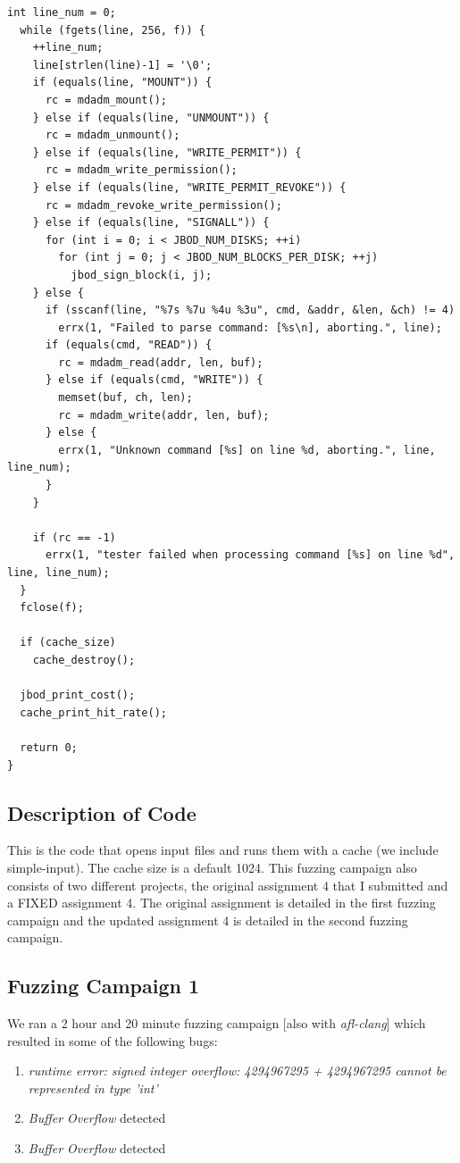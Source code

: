 \documentclass[11pt]{article}
\begin{document}
\begin{lstlisting}[style=CStyle]
  int line_num = 0;
  while (fgets(line, 256, f)) {
    ++line_num;
    line[strlen(line)-1] = '\0';
    if (equals(line, "MOUNT")) {
      rc = mdadm_mount();
    } else if (equals(line, "UNMOUNT")) {
      rc = mdadm_unmount();
    } else if (equals(line, "WRITE_PERMIT")) {
      rc = mdadm_write_permission();
    } else if (equals(line, "WRITE_PERMIT_REVOKE")) {
      rc = mdadm_revoke_write_permission();
    } else if (equals(line, "SIGNALL")) {
      for (int i = 0; i < JBOD_NUM_DISKS; ++i)
        for (int j = 0; j < JBOD_NUM_BLOCKS_PER_DISK; ++j)
          jbod_sign_block(i, j);
    } else {
      if (sscanf(line, "%7s %7u %4u %3u", cmd, &addr, &len, &ch) != 4)
        errx(1, "Failed to parse command: [%s\n], aborting.", line);
      if (equals(cmd, "READ")) {
        rc = mdadm_read(addr, len, buf);
      } else if (equals(cmd, "WRITE")) {
        memset(buf, ch, len);
        rc = mdadm_write(addr, len, buf);
      } else {
        errx(1, "Unknown command [%s] on line %d, aborting.", line, line_num);
      }
    }

    if (rc == -1)
      errx(1, "tester failed when processing command [%s] on line %d", line, line_num);
  }
  fclose(f);

  if (cache_size)
    cache_destroy();

  jbod_print_cost();
  cache_print_hit_rate();

  return 0;
}
\end{lstlisting}

\subsection{Description of Code}
This is the code that opens input files and runs them with a cache (we include simple-input). The cache size is a default 1024. This fuzzing campaign also consists of two different projects, the original assignment 4 that I submitted and a FIXED assignment 4. The original assignment is detailed in the first fuzzing campaign and the updated assignment 4 is detailed in the second fuzzing campaign. 


\subsection{Fuzzing Campaign 1}
We ran a 2 hour and 20 minute fuzzing campaign [also with \textit{afl-clang}] which resulted in some of the following bugs:
\begin{enumerate}
    \item \textit{runtime error: signed integer overflow: 4294967295 + 4294967295 cannot be represented in type 'int'}
    \item \textit{Buffer Overflow} detected
    \item \textit{Buffer Overflow} detected
\end{enumerate}
\end{document}
